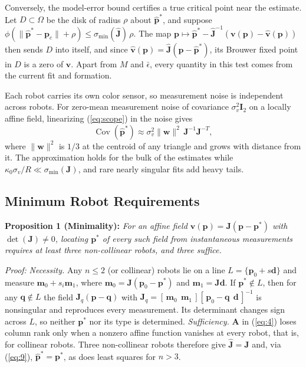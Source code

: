 \documentclass[lettersize,journal]{IEEEtran}
\begin{document}
Conversely, the model-error bound certifies a true critical point near the estimate. Let $D \subset \Omega$ be the disk of radius $\rho$ about $\hat{\mathbf{p}}^*$, and suppose $\phi(\|\hat{\mathbf{p}}^* - \mathbf{p}_c\| + \rho) \le \sigma_{\min}(\hat{\mathbf{J}})\,\rho$. The map $\mathbf{p} \mapsto \hat{\mathbf{p}}^* - \hat{\mathbf{J}}^{-1}(\mathbf{v}(\mathbf{p}) - \hat{\mathbf{v}}(\mathbf{p}))$ then sends $D$ into itself, and since $\hat{\mathbf{v}}(\mathbf{p}) = \hat{\mathbf{J}}(\mathbf{p} - \hat{\mathbf{p}}^*)$, its Brouwer fixed point in $D$ is a zero of $\mathbf{v}$. Apart from $M$ and $\bar{\epsilon}$, every quantity in this test comes from the current fit and formation.

Each robot carries its own color sensor, so measurement noise is independent across robots. For zero-mean measurement noise of covariance $\sigma_v^2\mathbf{I}_2$ on a locally affine field, linearizing (\ref{eq:scope}) in the noise gives
\begin{equation}\label{eq:cov}
\operatorname{Cov}(\hat{\mathbf{p}}^*) \approx \sigma_v^2\|\mathbf{w}\|^2\,\mathbf{J}^{-1}\mathbf{J}^{-T},
\end{equation}
where $\|\mathbf{w}\|^2$ is $1/3$ at the centroid of any triangle and grows with distance from it. The approximation holds for the bulk of the estimates while $\kappa_0\sigma_v/R \ll \sigma_{\min}(\mathbf{J})$, and rare nearly singular fits add heavy tails.


\subsection{Minimum Robot Requirements}

\noindent\textbf{Proposition 1 (Minimality):} \textit{For an affine field $\mathbf{v}(\mathbf{p}) = \mathbf{J}(\mathbf{p}-\mathbf{p}^*)$ with $\det(\mathbf{J}) \neq 0$, locating $\mathbf{p}^*$ of every such field from instantaneous measurements requires at least three non-collinear robots, and three suffice.}

\smallskip
\noindent\textit{Proof:} \textit{Necessity.} Any $n \le 2$ (or collinear) robots lie on a line $L = \{\mathbf{p}_0 + s\mathbf{d}\}$ and measure $\mathbf{m}_0 + s_i\mathbf{m}_1$, where $\mathbf{m}_0 = \mathbf{J}(\mathbf{p}_0 - \mathbf{p}^*)$ and $\mathbf{m}_1 = \mathbf{J}\mathbf{d}$. If $\mathbf{p}^* \notin L$, then for any $\mathbf{q} \notin L$ the field $\mathbf{J}_q(\mathbf{p} - \mathbf{q})$ with $\mathbf{J}_q = [\,\mathbf{m}_0\ \ \mathbf{m}_1\,][\,\mathbf{p}_0 - \mathbf{q}\ \ \mathbf{d}\,]^{-1}$ is nonsingular and reproduces every measurement. Its determinant changes sign across $L$, so neither $\mathbf{p}^*$ nor its type is determined. \textit{Sufficiency.} $\mathbf{A}$ in (\ref{eq:4}) loses column rank only when a nonzero affine function vanishes at every robot, that is, for collinear robots. Three non-collinear robots therefore give $\hat{\mathbf{J}} = \mathbf{J}$ and, via (\ref{eq:9}), $\hat{\mathbf{p}}^* = \mathbf{p}^*$, as does least squares for $n > 3$. \hfill\IEEEQED
\end{document}

